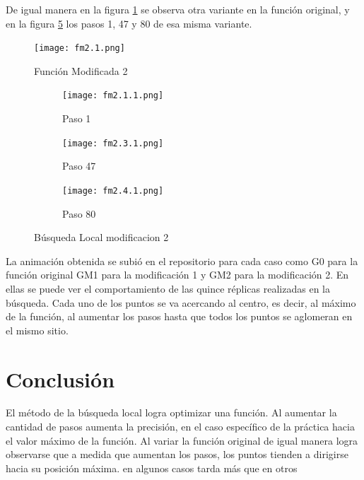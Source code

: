 \documentclass{article}
\begin{document}
De igual manera en la figura \ref{f5} se observa otra variante en la funci\'on original, y en la figura \ref{f6} los pasos 1, 47 y 80 de esa misma variante.

 \begin{figure}[H]
       \begin{center}
\texttt{[image: fm2.1.png]}
  \end{center}
\caption{Funci\'on Modificada 2} 
\label{f5}
\end{figure}

\begin{figure}[H]
       \centering
       \begin{subfigure}[b]{0.47\linewidth}
           \texttt{[image: fm2.1.1.png]}
           \caption{Paso 1}
           \label{f3.a}
        \end{subfigure}
        \begin{subfigure}[b]{0.47\linewidth}
            \texttt{[image: fm2.3.1.png]}
            \caption{Paso 47}	
            \label{f3.b}
        \end{subfigure}
\begin{subfigure}[b]{0.47\linewidth}
            \texttt{[image: fm2.4.1.png]}
            \caption{Paso 80}
            \label{f3.b}
        \end{subfigure}
\caption{B\'usqueda Local modificacion 2}
        \label{f6}
\end{figure}

La animaci\'on obtenida  se subi\'o en el repositorio \citep{ana} para cada caso como G0 para la funci\'on original GM1 para la modificaci\'on 1 y GM2 para la modificaci\'on 2. En ellas se puede ver el comportamiento de las quince r\'eplicas realizadas en la b\'usqueda.  Cada uno de los puntos se va acercando al centro, es decir, al m\'aximo de la funci\'on, al aumentar los pasos hasta que todos los puntos se aglomeran en el mismo sitio.

\section{Conclusi\'{o}n}\label{con}

El m\'etodo de la b\'usqueda local logra optimizar una funci\'on. Al aumentar la cantidad de pasos aumenta la precisi\'on, en el caso espec\'ifico de la pr\'actica hacia el valor m\'aximo de la funci\'on. Al variar la funci\'on original de igual manera logra observarse que a medida que aumentan los pasos, los puntos tienden a dirigirse hacia su posici\'on m\'axima. en algunos casos tarda m\'as que en otros
\end{document}
